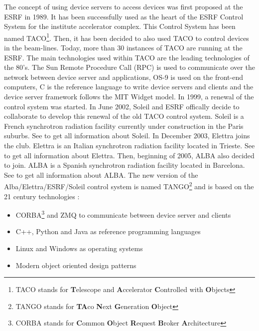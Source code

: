 The concept of using device servers to access devices was first proposed
at the ESRF in 1989. It has been successfully used as the heart of
the ESRF Control System for the institute accelerator
complex. This Control System has been named TACO\footnote{TACO stands for \textbf{T}elescope and \textbf{A}ccelerator \textbf{C}ontrolled
with \textbf{O}bjects}. Then, it has been decided to also used TACO to control devices in
the beam-lines. Today, more than 30 instances of TACO are running
at the ESRF. The main technologies used within TACO are the leading
technologies of the 80's. The Sun Remote Procedure Call (RPC) is used
to communicate over the network between device server and applications,
OS-9 is used on the front-end computers, C is the reference language
to write device servers and clients and the device server framework
follows the MIT Widget model. In 1999, a renewal of the control system
was started. In June 2002, Soleil and ESRF offically
decide to collaborate to develop this renewal of the old TACO control
system. Soleil is a French synchrotron radiation facility currently
under construction in the Paris suburbs. See \cite{Soleil_home_page}
to get all information about Soleil. In December 2003, Elettra
joins the club. Elettra is an Italian synchrotron radiation facility
located in Trieste. See \cite{Elettra_home_page} to get all information
about Elettra. Then, beginning of 2005, ALBA also decided
to join. ALBA is a Spanish synchrotron radiation facility located
in Barcelona. See \cite{Alba_WEB} to get all information about ALBA.
The new version of the Alba/Elettra/ESRF/Soleil control system is
named TANGO\footnote{TANGO stands for \textbf{TA}co \textbf{N}ext \textbf{G}eneration \textbf{O}bject}
and is based on the 21 century technologies :
\begin{itemize}
\item CORBA\footnote{CORBA stands for \textbf{C}ommon \textbf{O}bject \textbf{R}equest
\textbf{B}roker \textbf{A}rchitecture} and ZMQ\cite{ZMQ} to communicate between device server
and clients 
\item C++, Python and Java as reference programming languages 
\item Linux and Windows as operating systems 
\item Modern object oriented design patterns
\end{itemize}

